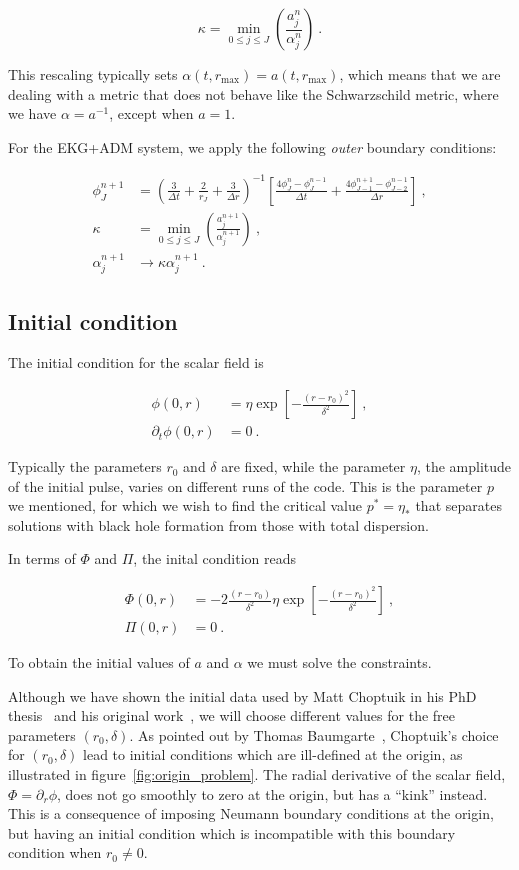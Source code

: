 \documentclass[a4paper,11pt]{article}
\renewcommand{\a}{\alpha}
\renewcommand{\d}{\delta}
\newcommand{\pd}{\partial}
\newcommand{\nn}{\nonumber}
\newcommand{\dt}{\Delta t}
\newcommand{\dr}{\Delta r}
\newcommand{\lrpar}[1]{\left( #1 \right)}
\newcommand{\lrsquare}[1]{\left[ #1 \right]}
\newcommand{\n}{\noindent}
\newcommand{\eq}[1]{
  \begin{equation}
    #1
  \end{equation}
}
\newcommand{\spl}[1]{
  \begin{split}
    #1
  \end{split}
}
\newcommand{\al}[1]{
  \begin{align}
    #1
  \end{align}
}
\renewcommand{\parbox}[2]{

  \vspace*{0.25in}
  
  \begin{tcolorbox}[title=Box #1,colback=blue!5!white,colframe=gray!75!black]
    #2
  \end{tcolorbox}

  \vspace*{0.25in}

}
\begin{document}
\eq{ \kappa = \min_{0\leq j\leq J}\lrpar{\frac{a^{n}_{j}}{\a^{n}_{j}}}\ . }

\n This rescaling typically sets $\a(t,r_{\max}) = a(t,r_{\max})$, which means that we are dealing with a metric that does not behave like the Schwarzschild metric, where we have $\a = a^{-1}$, except when $a=1$.

\parbox{5: EKG+ADM -- Outer boundary conditions}{
  For the EKG+ADM system, we apply the following \emph{outer} boundary conditions:
  \al{
    \phi^{n+1}_{J} &= \lrpar{\frac{3}{\dt} + \frac{2}{r_{J}} + \frac{3}{\dr}}^{-1}\lrsquare{\frac{4\phi^{n}_{J} - \phi^{n-1}_{J}}{\dt} + \frac{4\phi^{n+1}_{J-1} - \phi^{n-1}_{J-2}}{\dr}}\ ,\nn\\
    \kappa &= \min_{0\leq j\leq J}\lrpar{\frac{a^{n+1}_{j}}{\a^{n+1}_{j}}}\ ,\nn\\
    \a^{n+1}_{j} &\to \kappa\a^{n+1}_{j}\ .\nn
  }
}

\subsection{Initial condition}

The initial condition for the scalar field is

\eq{
  \spl{
    \phi(0,r) &= \eta\exp\lrsquare{-\frac{\lrpar{r-r_{0}}^{2}}{\d^{2}}}\ ,\\
    \pd_{t}\phi(0,r) &= 0\ .
  }
  \label{eq:initial_condition_1}
}

\n Typically the parameters $r_{0}$ and $\d$ are fixed, while the parameter $\eta$, the amplitude of the initial pulse, varies on different runs of the code. This is the parameter $p$ we mentioned, for which we wish to find the critical value $p^{*}=\eta_{*}$ that separates solutions with black hole formation from those with total dispersion.

In terms of $\Phi$ and $\Pi$, the inital condition reads

\eq{
  \spl{
    \Phi(0,r) &= -2\frac{\lrpar{r-r_{0}}}{\d^{2}}\eta\exp\lrsquare{-\frac{\lrpar{r-r_{0}}^{2}}{\d^{2}}}\ ,\\
    \Pi(0,r)  &= 0\ .
  }
  \label{eq:initial_condition_2}
}

\n To obtain the initial values of $a$ and $\a$ we must solve the constraints.

Although we have shown the initial data used by Matt Choptuik in his PhD thesis~\cite{Choptuik_1986} and his original work~\cite{PhysRevLett.70.9}, we will choose different values for the free parameters $\lrpar{r_{0},\d}$. As pointed out by Thomas Baumgarte~\cite{Baumgarte_private}, Choptuik's choice for $\lrpar{r_{0},\d}$ lead to initial conditions which are ill-defined at the origin, as illustrated in figure~\ref{fig:origin_problem}. The radial derivative of the scalar field, $\Phi=\pd_{r}\phi$, does not go smoothly to zero at the origin, but has a ``kink'' instead. This is a consequence of imposing Neumann boundary conditions at the origin, but having an initial condition which is incompatible with this boundary condition when $r_{0}\neq 0$.
\end{document}
